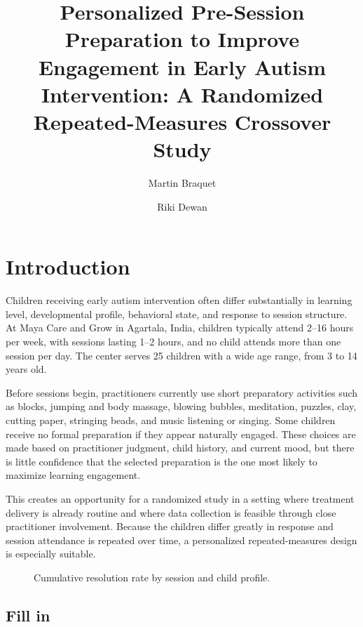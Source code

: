 \documentclass[9pt,a4paper,twocolumn,twoside]{rho-class/rho}
\title{Personalized Pre-Session Preparation to Improve Engagement in Early Autism Intervention: A Randomized Repeated-Measures Crossover Study}
\author[{\textasteriskcentered},\textdagger,a]{Martin Braquet}
\author[{\textdagger},b]{Riki Dewan}
\affil[a]{Affiliation of author one}
\affil[b]{Affiliation of author two}
\begin{document}
	
	\maketitle
	\thispagestyle{firststyle}
	
	
	\section{Introduction}
	
	
	Children receiving early autism intervention often differ substantially in learning level, developmental profile, behavioral state, and response to session structure. At Maya Care and Grow in Agartala, India, children typically attend 2–16 hours per week, with sessions lasting 1–2 hours, and no child attends more than one session per day. The center serves 25 children with a wide age range, from 3 to 14 years old.
	
	Before sessions begin, practitioners currently use short preparatory activities such as blocks, jumping and body massage, blowing bubbles, meditation, puzzles, clay, cutting paper, stringing beads, and music listening or singing. Some children receive no formal preparation if they appear naturally engaged. These choices are made based on practitioner judgment, child history, and current mood, but there is little confidence that the selected preparation is the one most likely to maximize learning engagement.
	
	This creates an opportunity for a randomized study in a setting where treatment delivery is already routine and where data collection is feasible through close practitioner involvement. Because the children differ greatly in response and session attendance is repeated over time, a personalized repeated-measures design is especially suitable.
	
	\begin{figure}[ht]
		\centering
		
		\caption{Cumulative resolution rate by session and child profile.}
		\label{fig:resolution_curve}
	\end{figure}
	
	\subsection{Fill in}
	
\end{document}
